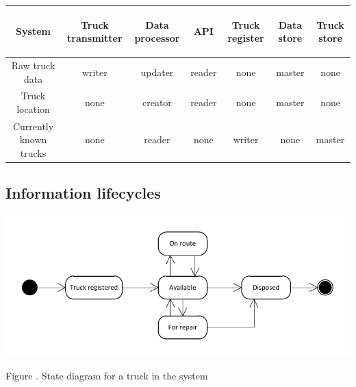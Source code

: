 \documentclass[a4paper,11pt]{report}
\newcommand{\mycaption}[1]{
  \addtocounter{figures}{1}
  Figure \arabic{figures}. #1
}
\begin{document}
\begin{tabular}{|c|c|c|c|c|c|c|}
\begin{sideways}\textbf{System}\end{sideways} & \begin{sideways}\textbf{Truck transmitter}\end{sideways} & \begin{sideways}\textbf{Data processor}\end{sideways} & \begin{sideways}\textbf{API}\end{sideways} & \begin{sideways}\textbf{Truck register}\end{sideways} & \begin{sideways}\textbf{Data store}\end{sideways} & \begin{sideways}\textbf{Truck store}\end{sideways} \\\hline
Raw truck data & writer & updater & reader & none & master & none \\\hline
Truck location & none & creator & reader & none & master & none \\\hline
Currently known trucks & none & reader & none & writer & none & master \\\hline
\end{tabular}

\subsection{Information lifecycles}
\label{sec:inform-lifecycl}

\begin{center}
  \includegraphics[width=\textwidth]{figures/Information_lifecycle}\\
  \mycaption{State diagram for a truck in the system}
\end{center}
\end{document}
